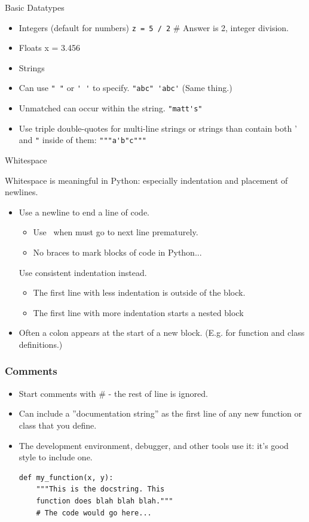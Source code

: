 \documentclass[12pt,handout]{beamer}
\newcommand{\code}[1]{\lstinline{#1}}
\begin{document}
\begin{frame}{Basic Datatypes}

\begin{itemize}

\item Integers (default for numbers)
  \code{z = 5 / 2} \# Answer is 2, integer division.
\item Floats
  x = 3.456
\item Strings
\item Can use \code{" "} or \code{' '} to specify.
  \code{"abc" 'abc'} (Same thing.)
\item Unmatched can occur within the string.
  \code{"matt's"}
\item Use triple double-quotes for multi-line strings or strings than contain both '
  and \code{"} inside of them:
  \code{"""a'b"c"""}

\end{itemize}
\end{frame}

\begin{frame}{Whitespace}

Whitespace is meaningful in Python: especially
indentation and placement of newlines.

\begin{itemize}
\item Use a newline to end a line of code.
\begin{itemize}
\item Use \ when must go to next line prematurely.
\item No braces { } to mark blocks of code in Python...
\end{itemize}
Use consistent indentation instead.
\begin{itemize}
\item The first line with less indentation is outside of the block.
\item The first line with more indentation starts a nested block
\end{itemize}
\item Often a colon appears at the start of a new block.
(E.g. for function and class definitions.)
\end{itemize}
\end{frame}

\begin{frame}[fragile]
\frametitle{Comments}

\begin{itemize}
\item Start comments with \# - the rest of line is ignored.
\item Can include a ''documentation string'' as the first line of any
new function or class that you define.
\item The development environment, debugger, and other tools use
it: it's good style to include one.
\small{
\begin{verbatim}
def my_function(x, y):
    """This is the docstring. This
    function does blah blah blah."""
    # The code would go here...
\end{verbatim}
}
\end{itemize}
\end{frame}
\end{document}
